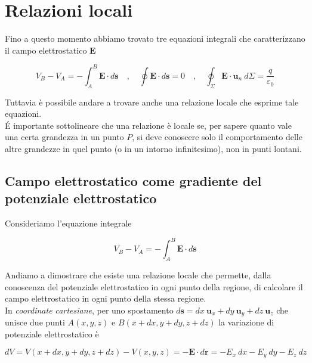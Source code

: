 \chapter{Relazioni locali}

Fino a questo momento abbiamo trovato tre equazioni integrali che caratterizzano il campo elettrostatico $\mathbf{E}$

\begin{equation*}
    V_B - V_A = - \int_A^B \mathbf{E} \cdot d \mathbf{s} \quad , \quad \oint \mathbf{E} \cdot d \mathbf{s} = 0 \quad , \quad \oint_{\Sigma} \mathbf{E} \cdot \mathbf{u}_n \ d \Sigma = \frac{q}{\varepsilon_0}
\end{equation*}

Tuttavia è possibile andare a trovare anche una relazione locale che esprime tale equazioni. \\

\' E importante sottolineare che una relazione è locale se, per sapere quanto vale una certa grandezza in un punto $P$, si deve conoscere solo il comportamento delle altre grandezze in quel punto (o in un intorno infinitesimo), non in punti lontani.

\section{Campo elettrostatico come gradiente del potenziale elettrostatico}

Consideriamo l'equazione integrale 

\begin{equation*}
    V_B - V_A = - \int_A^B \mathbf{E} \cdot d \mathbf{s}
\end{equation*}

Andiamo a dimostrare che esiste una relazione locale che permette, dalla conoscenza del potenziale elettrostatico in ogni punto della regione, di calcolare il campo elettrostatico in ogni punto della stessa regione. \\

In \emph{coordinate cartesiane}, per uno spostamento $d \mathbf{s} = dx \ \mathbf{u}_x + dy \ \mathbf{u}_y + dz \ \mathbf{u}_z$ che unisce due punti $A (x,y,z)$ e $B(x+dx, y+dy, z+dz)$ la variazione di potenziale elettrostatico è 

\begin{equation*}
    dV = V(x+dx, y+dy, z+dz) - V(x,y,z) = - \mathbf{E} \cdot d \mathbf{r} = - E_x \ dx - E_y \ dy - E_z \ dz 
\end{equation*}

